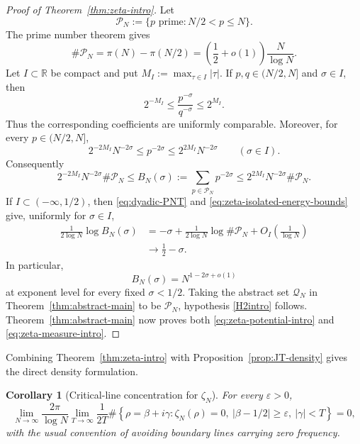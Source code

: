\documentclass[11pt]{article}
\newtheorem{corollary}[theorem]{Corollary}
\theoremstyle{definition}
\newcommand{\R}{\mathbb R}
\newcommand{\1}{\mathbf 1}
\begin{document}
\begin{proof}[Proof of Theorem~\ref{thm:zeta-intro}]
Let
\begin{equation}\label{eq:zeta-QN}
\mathcal P_N:=\{p\text{ prime}:N/2<p\le N\}.
\end{equation}
The prime number theorem gives
\begin{equation}\label{eq:dyadic-PNT}
\#\mathcal P_N
=\pi(N)-\pi(N/2)
=\left(\frac12+o(1)\right)\frac{N}{\log N}.
\end{equation}
Let $I\subset\R$ be compact and put $M_I:=\max_{\tau\in I}|\tau|$.  If $p,q\in(N/2,N]$ and $\sigma\in I$, then
\begin{equation}\label{eq:zeta-comparable}
2^{-M_I}
\le
\frac{p^{-\sigma}}{q^{-\sigma}}
\le
2^{M_I}.
\end{equation}
Thus the corresponding coefficients are uniformly comparable.  Moreover, for every $p\in(N/2,N]$,
\[
2^{-2M_I}N^{-2\sigma}
\le p^{-2\sigma}
\le2^{2M_I}N^{-2\sigma}
\qquad(\sigma\in I).
\]
Consequently
\begin{equation}\label{eq:zeta-isolated-energy-bounds}
2^{-2M_I}N^{-2\sigma}\#\mathcal P_N
\le B_N(\sigma):=\sum_{p\in\mathcal P_N}p^{-2\sigma}
\le2^{2M_I}N^{-2\sigma}\#\mathcal P_N.
\end{equation}
If $I\subset(-\infty,1/2)$, then \eqref{eq:dyadic-PNT} and \eqref{eq:zeta-isolated-energy-bounds} give, uniformly for $\sigma\in I$,
\begin{align*}
\frac1{2\log N}\log B_N(\sigma)
&=-\sigma+\frac1{2\log N}\log\#\mathcal P_N+O_I\left(\frac1{\log N}\right)\\
&\longrightarrow\frac12-\sigma.
\end{align*}
In particular,
\begin{equation}\label{eq:zeta-isolated-energy}
B_N(\sigma)=N^{1-2\sigma+o(1)}
\end{equation}
at exponent level for every fixed $\sigma<1/2$.  Taking the abstract set $\mathcal Q_N$ in Theorem~\ref{thm:abstract-main} to be $\mathcal P_N$, hypothesis \ref{H2intro} follows.  Theorem~\ref{thm:abstract-main} now proves both \eqref{eq:zeta-potential-intro} and \eqref{eq:zeta-measure-intro}.
\end{proof}

Combining Theorem~\ref{thm:zeta-intro} with Proposition~\ref{prop:JT-density} gives the direct density formulation.

\begin{corollary}[Critical-line concentration for $\zeta_N$]\label{cor:zeta-density}
For every $\varepsilon>0$,
\begin{equation}\label{eq:zeta-density-coro}
\lim_{N\to\infty}
\frac{2\pi}{\log N}
\lim_{T\to\infty}\frac1{2T}
\#\left\{
\rho=\beta+i\gamma:\zeta_N(\rho)=0,
\ |\beta-1/2|\ge\varepsilon,
\ |\gamma|<T
\right\}
=0,
\end{equation}
with the usual convention of avoiding boundary lines carrying zero frequency.
\end{corollary}
\end{document}
